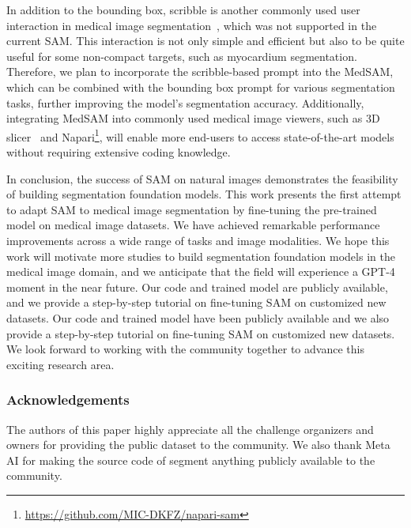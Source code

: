 \documentclass[runningheads]{llncs}
\begin{document}
In addition to the bounding box, scribble is another commonly used user interaction in medical image segmentation~\cite{wang-deepigeos-PAMI}\cite{wang-interactive2}, which was not supported in the current SAM. This interaction is not only simple and efficient but also to be quite useful for some non-compact targets, such as myocardium segmentation. 
Therefore, we plan to incorporate the scribble-based prompt into the MedSAM, which can be combined with the bounding box prompt for various segmentation tasks, further improving the model's segmentation accuracy. Additionally, integrating MedSAM into commonly used medical image viewers, such as 3D slicer~\cite{SAM-3DSlicer} and Napari\footnote{\url{https://github.com/MIC-DKFZ/napari-sam}}, will enable more end-users to access state-of-the-art models without requiring extensive coding knowledge.

In conclusion, the success of SAM on natural images demonstrates the feasibility of building segmentation foundation models. This work presents the first attempt to adapt SAM to medical image segmentation by fine-tuning the pre-trained model on medical image datasets. We have achieved remarkable performance improvements across a wide range of tasks and image modalities. We hope this work will motivate more studies to build segmentation foundation models in the medical image domain, and we anticipate that the field will experience a GPT-4 moment in the near future. Our code and trained model are publicly available, and we provide a step-by-step tutorial on fine-tuning SAM on customized new datasets. 
Our code and trained model have been publicly available and we also provide a step-by-step tutorial on fine-tuning SAM on customized new datasets. 
We look forward to working with the community together to advance this exciting research area.



\subsubsection{Acknowledgements} 
The authors of this paper highly appreciate all the challenge organizers and owners for providing the public dataset to the community. We also thank Meta AI for making the source code of segment anything publicly available to the community. 

%
\newpage


\end{document}
